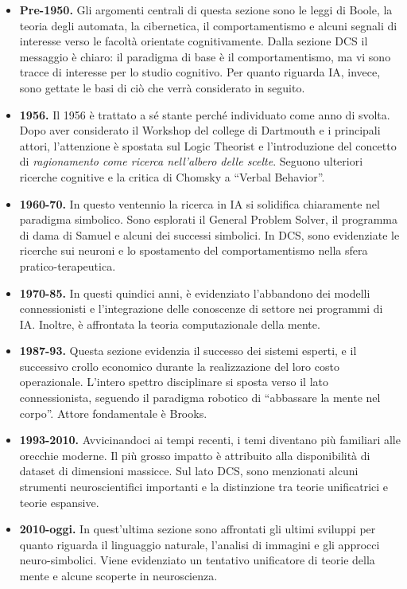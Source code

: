 \documentclass[../main.tex]{subfiles}
\begin{document}
\begin{itemize}
    \item \textbf{Pre-1950.} Gli argomenti centrali di questa sezione sono le leggi di Boole, la teoria degli automata, la cibernetica, il comportamentismo e alcuni segnali di interesse verso le facoltà orientate cognitivamente. Dalla sezione DCS il messaggio è chiaro: il paradigma di base è il comportamentismo, ma vi sono tracce di interesse per lo studio cognitivo. Per quanto riguarda IA, invece, sono gettate le basi di ciò che verrà considerato in seguito.
    \item \textbf{1956.} Il 1956 è trattato a sé stante perché individuato come anno di svolta. Dopo aver considerato il Workshop del college di Dartmouth e i principali attori, l'attenzione è spostata sul Logic Theorist e l'introduzione del concetto di \textit{ragionamento come ricerca nell'albero delle scelte}. Seguono ulteriori ricerche cognitive e la critica di Chomsky a ``Verbal Behavior''.
    \item \textbf{1960-70.} In questo ventennio la ricerca in IA si solidifica chiaramente nel paradigma simbolico. Sono esplorati il General Problem Solver, il programma di dama di Samuel e alcuni dei successi simbolici. In DCS, sono evidenziate le ricerche sui neuroni e lo spostamento del comportamentismo nella sfera pratico-terapeutica.
    \item \textbf{1970-85.} In questi quindici anni, è evidenziato l'abbandono dei modelli connessionisti e l'integrazione delle conoscenze di settore nei programmi di IA. Inoltre, è affrontata la teoria computazionale della mente.
    \item \textbf{1987-93.} Questa sezione evidenzia il successo dei sistemi esperti, e il successivo crollo economico durante la realizzazione del loro costo operazionale. L'intero spettro disciplinare si sposta verso il lato connessionista, seguendo il paradigma robotico di ``abbassare la mente nel corpo''. Attore fondamentale è Brooks.
    \item \textbf{1993-2010.} Avvicinandoci ai tempi recenti, i temi diventano più familiari alle orecchie moderne. Il più grosso impatto è attribuito alla disponibilità di dataset di dimensioni massicce. Sul lato DCS, sono menzionati alcuni strumenti neuroscientifici importanti e la distinzione tra teorie unificatrici e teorie espansive.
    \item \textbf{2010-oggi.} In quest'ultima sezione sono affrontati gli ultimi sviluppi per quanto riguarda il linguaggio naturale, l'analisi di immagini e gli approcci neuro-simbolici. Viene evidenziato un tentativo unificatore di teorie della mente e alcune scoperte in neuroscienza.
\end{itemize}
\end{document}
